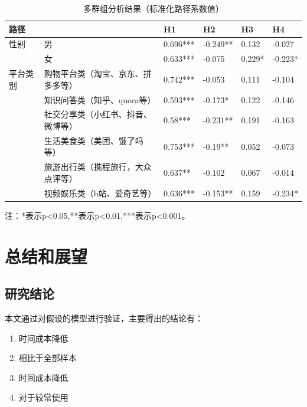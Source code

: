 \documentclass[12pt,UTF8]{ctexart}
\begin{document}
\begin{spacing}{1.25}
\begin{table}[H]
\centering
\caption{多群组分析结果（标准化路径系数值）}
\label{tab:multi}
\begin{threeparttable}
\begin{tabular}{@{}llllll@{}}
\toprule
\textbf{路径} & \textbf{}         & \textbf{H1} & \textbf{H2} & \textbf{H3} & \textbf{H4} \\ \midrule
性别          & 男                 & 0.696***    & -0.249**    & 0.132       & -0.027      \\
            & 女                 & 0.633***    & -0.075      & 0.229*      & -0.223*     \\ \midrule
平台类别        & 购物平台类（淘宝、京东、拼多多等） & 0.742***    & -0.053      & 0.111       & -0.104      \\
            & 知识问答类（知乎、quora等）  & 0.593***    & -0.173*     & 0.122       & -0.146      \\
            & 社交分享类（小红书、抖音、微博等） & 0.58***     & -0.231**    & 0.191       & -0.163      \\
            & 生活美食类（美团、饿了吗等）    & 0.753***    & -0.19**     & 0.052       & -0.073      \\
            & 旅游出行类（携程旅行，大众点评等） & 0.637**     & -0.102      & 0.067       & -0.014      \\
            & 视频娱乐类（b站、爱奇艺等）    & 0.636***    & -0.153**    & 0.159       & -0.234*     \\ \bottomrule
\end{tabular}
\begin{tablenotes}
    \item 注：*表示p<0.05,**表示p<0.01,***表示p<0.001。
\end{tablenotes}
\end{threeparttable}
\end{table}


\setcounter{table}{0}
\setcounter{figure}{0}
\section{总结和展望}
\subsection{研究结论}

本文通过对假设的模型进行验证，主要得出的结论有：
\begin{enumerate}[(1)]
    \item 时间成本降低
    \item 相比于全部样本
    \item 时间成本降低
    \item 对于较常使用
\end{enumerate}


\end{spacing}
\end{document}
